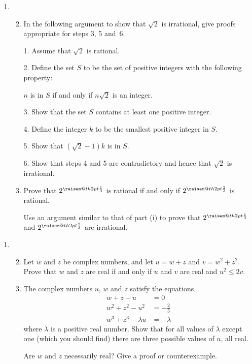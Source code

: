 \documentclass[a4, 11pt]{report}
\makeatletter
\newcommand{\raisemath}[1]{\mathpalette{\raisem@th{#1}}}
\newcommand{\raisem@th}[3]{\raisebox{#1}{$#2#3$}}
\newlength{\qspace}
\newcounter{qnumber}
\newenvironment{question}%
 {\vspace{\qspace}
  \begin{enumerate}[\bfseries 1\quad][10]%
    \setcounter{enumi}{\value{qnumber}}%
    \item%
 }
{
  \end{enumerate}
  \filbreak
  \stepcounter{qnumber}
 }
\newenvironment{questionparts}[1][1]%
 {
  \begin{enumerate}[\bfseries (i)]%
    \setcounter{enumii}{#1}
    \addtocounter{enumii}{-1}
    \setlength{\itemsep}{5mm}
    \setlength{\parskip}{8pt}
 }
 {
  \end{enumerate}
 }
\def\le{\leqslant}
\renewcommand{\.}[1]{\ensuremath{\mathrm{#1}}}
\newcommand{\+}[1]{\ensuremath{\mathbf{#1}}}
\makeatother
\begin{document}
\begin{question}
\begin{questionparts}

\item In the following argument to show  that $\sqrt2$ is irrational, give proofs appropriate for steps 3, 5 and~6.

1. Assume that $\sqrt2$ is rational.

2. Define  the set $S$ to be  the set  of positive integers  with  the following property: 

\begin{center}

$n$ is in $S$ if and only if  $n \sqrt2$ is an integer. 

\end{center}

3. Show that the set $S$ contains at least one positive integer. 

4. Define the integer $k$ to be the smallest positive integer in $S$.

5. Show that $(\sqrt2-1)k$ is in $S$. 

6. Show that steps 4 and 5 are contradictory and hence that $\sqrt2$ is irrational.

\item Prove that $2^{\raisemath{2pt}{\frac13}} $  is rational if and only if $2^{\raisemath{2pt}{\frac23}}$ is rational.

Use an argument similar to that of part (i) to prove that $2^{\raisemath{2pt}{\frac13}} $  and $2^{\raisemath{2pt}{\frac23}}$ are irrational.
\end{questionparts}
\end{question}
	
\begin{question}
\begin{questionparts}
\item Let $w$ and $z$ be complex numbers, and let $u= w+z$ and $v=w^2+z^2$. Prove that $w$ and $z$ are real if and only if $u$ and $v$ are real and $u^2\le2v$.
\item The complex numbers $u$, $w$ and $z$ satisfy the equations
\begin{align*}
w+z-u&=0 \\
w^2+z^2 -u^2 &= - \tfrac 23 \\
w^3+z^3 -\lambda u &= -\lambda\,
\end{align*}
where $\lambda $ is a positive real number. Show that for all values of $\lambda$ except one (which you should find) there are three possible values of $u$, all real.



Are  $w$ and $z$ necessarily real? Give a proof or counterexample.

\end{questionparts}
\end{question}
	
\end{document}
